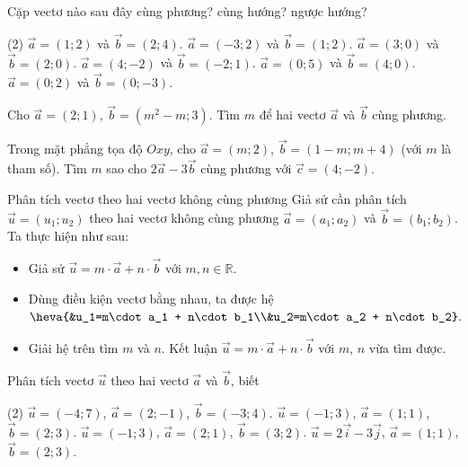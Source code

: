 \begin{vd}
	Cặp vectơ nào sau đây cùng phương? cùng hướng? ngược hướng?
	\begin{tasks}(2)
		\task $\vec{a}=(1;2)$ và $\vec{b}=(2;4)$.
		\task $\vec{a}=(-3;2)$ và $\vec{b}=(1;2)$.
		\task $\vec{a}=(3;0)$ và $\vec{b}=(2;0)$.
		\task $\vec{a}=(4;-2)$ và $\vec{b}=(-2;1)$.
		\task $\vec{a}=(0;5)$ và $\vec{b}=(4;0)$.
		\task $\vec{a}=(0;2)$ và $\vec{b}=(0;-3)$.
	\end{tasks}
	
\end{vd}

\begin{vd}
	Cho $\overrightarrow{a}=(2;1)$, $\overrightarrow{b}=(m^2-m;3)$. Tìm $m$ để hai vectơ $\overrightarrow{a}$ và $\overrightarrow{b}$ cùng phương.
\end{vd}

\begin{vd}%
	Trong mặt phẳng tọa độ $Oxy$, cho $\vec{a}=(m;2)$, $\vec{b}=(1-m;m+4)$ (với $m$ là tham số). Tìm $m$ sao cho $2\vec{a}-3\vec{b}$ cùng phương với $\vec{c}=(4;-2)$.
\end{vd}

\begin{dang}{Phân tích vectơ theo hai vectơ không cùng phương}
	Giả sử cần phân tích $\vec{u}=(u_1;u_2)$ theo hai vectơ không cùng phương $\vec{a}=(a_1;a_2)$ và $\vec{b}=(b_1;b_2)$. Ta thực hiện như sau:
	\begin{itemize}
		\item [$\bullet$] Giả sử $\vec{u} =m \cdot \vec{a} + n \cdot \vec{b}$ với $m,n \in \mathbb{R}$.
		\item [$\bullet$] Dùng điều kiện vectơ bằng nhau, ta được hệ
		$\heva{&u_1=m\cdot a_1 + n\cdot b_1\\&u_2=m\cdot a_2 + n\cdot b_2}.$
		\item [$\bullet$] Giải hệ trên tìm $m$ và $n$. Kết luận $\vec{u} =m \cdot \vec{a} + n \cdot \vec{b}$ với $m$, $n$ vừa tìm được.
	\end{itemize}
	
\end{dang}

\begin{vd}
	Phân tích vectơ $\overrightarrow{u}$ theo hai vectơ $\overrightarrow{a}$ và $\overrightarrow{b}$, biết
	\begin{tasks}(2)
		\task $\overrightarrow{u}=(-4;7)$, $\overrightarrow{a}=(2;-1)$, $\overrightarrow{b}=(-3;4)$.
		\task $\overrightarrow{u}=(-1;3)$, $\overrightarrow{a}=(1;1)$, $\overrightarrow{b}=(2;3)$.
		\task $\overrightarrow{u}=(-1;3)$, $\overrightarrow{a}=(2;1)$, $\overrightarrow{b}=(3;2)$.
		\task $\overrightarrow{u}=2\overrightarrow{i}-3\overrightarrow{j}$, $\overrightarrow{a}=(1;1)$, $\overrightarrow{b}=(2;3)$.
	\end{tasks}
\end{vd}


